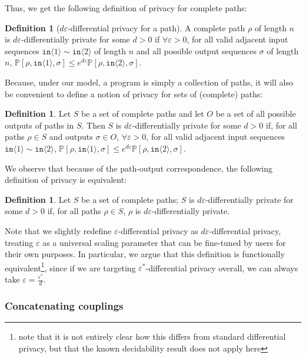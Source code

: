 \documentclass[12pt]{article}
\newcommand{\PP}{\mathbb{P}}
\newcommand{\brangle}[1]{\langle#1 \rangle}
\theoremstyle{definition}
\newtheorem{defn}[thm]{Definition}
\begin{document}
Thus, we get the following definition of privacy for complete paths:

\begin{defn}[$d\varepsilon$-differential privacy for a path]
    A complete path $\rho$ of length $n$ is $d\varepsilon$-differentially private for some $d>0$ if $\forall \varepsilon>0$, for all valid adjacent input sequences $\texttt{in}\brangle{1}\sim \texttt{in}\brangle{2}$ of length $n$ and all possible output sequences $\sigma$ of length $n$, $\PP[\rho, \texttt{in}\brangle{1}, \sigma]\leq e^{d\varepsilon}\PP[\rho, \texttt{in}\brangle{2}, \sigma]$.
\end{defn}

Because, under our model, a program is simply a collection of paths, it will also be convenient to define a notion of privacy for sets of (complete) paths:
\begin{defn}
    Let $S$ be a set of complete paths and let $O$ be a set of all possible outputs of paths in $S$. 
    Then $S$ is $d\varepsilon$-differentially private for some $d>0$ if, for all paths $\rho\in S$ and outputs $\sigma\in O$, $\forall \varepsilon>0$, for all valid adjacent input sequences $\texttt{in}\brangle{1}\sim \texttt{in}\brangle{2}$, $\PP[\rho, \texttt{in}\brangle{1}, \sigma]\leq e^{d\varepsilon}\PP[\rho, \texttt{in}\brangle{2}, \sigma]$.
\end{defn}

We observe that because of the path-output correspondence, the following definition of privacy is equivalent:
\begin{defn}
    Let $S$ be a set of complete paths; $S$ is $d\varepsilon$-differentially private for some $d>0$ if, for all paths $\rho\in S$, $\rho$ is $d\varepsilon$-differentially private.
\end{defn}

Note that we slightly redefine $\varepsilon$-differential privacy as $d\varepsilon$-differential privacy, treating $\varepsilon$ as a universal scaling parameter that can be fine-tuned by users for their own purposes. 
In particular, we argue that this definition is functionally equivalent\footnote{\cite{chadhaLinearTimeDecidability2021} note that it is not entirely clear how this differs from standard differential privacy, but that the known decidability result does not apply here}, since if we are targeting $\varepsilon^*$-differential privacy overall, we can always take $\varepsilon = \frac{\varepsilon^*}{d}$.

\subsubsection{Concatenating couplings}
\end{document}
